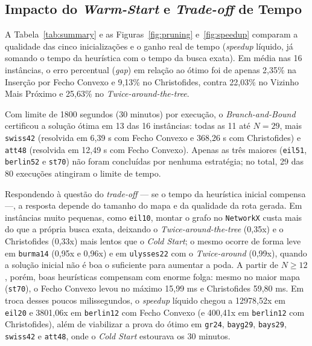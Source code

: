 \documentclass[12pt]{article}
\begin{document}
\subsection{Impacto do \textit{Warm-Start} e \textit{Trade-off} de Tempo}

A Tabela~\ref{tab:summary} e as Figuras~\ref{fig:pruning} e~\ref{fig:speedup} comparam a qualidade das cinco inicializações e o ganho real de tempo (\textit{speedup} líquido, já somando o tempo da heurística com o tempo da busca exata). Em média nas 16 instâncias, o erro percentual (\textit{gap}) em relação ao ótimo foi de apenas 2,35\% na Inserção por Fecho Convexo e 9,13\% no Christofides, contra 22,03\% no Vizinho Mais Próximo e 25,63\% no \textit{Twice-around-the-tree}.

Com limite de 1800 segundos (30 minutos) por execução, o \textit{Branch-and-Bound} certificou a solução ótima em 13 das 16 instâncias: todas as 11 até $N = 29$, mais \texttt{swiss42} (resolvida em 6,39 s com Fecho Convexo e 368,26 s com Christofides) e \texttt{att48} (resolvida em 12,49 s com Fecho Convexo). Apenas as três maiores (\texttt{eil51}, \texttt{berlin52} e \texttt{st70}) não foram concluídas por nenhuma estratégia; no total, 29 das 80 execuções atingiram o limite de tempo.

Respondendo à questão do \textit{trade-off} — se o tempo da heurística inicial compensa —, a resposta depende do tamanho do mapa e da qualidade da rota gerada. Em instâncias muito pequenas, como \texttt{eil10}, montar o grafo no \texttt{NetworkX} custa mais do que a própria busca exata, deixando o \textit{Twice-around-the-tree} (0,35x) e o Christofides (0,33x) mais lentos que o \textit{Cold Start}; o mesmo ocorre de forma leve em \texttt{burma14} (0,95x e 0,96x) e em \texttt{ulysses22} com o \textit{Twice-around} (0,99x), quando a solução inicial não é boa o suficiente para aumentar a poda. A partir de $N \ge 12$, porém, boas heurísticas compensam com enorme folga: mesmo no maior mapa (\texttt{st70}), o Fecho Convexo levou no máximo 15,99 ms e Christofides 59,80 ms. Em troca desses poucos milissegundos, o \textit{speedup} líquido chegou a 12978,52x em \texttt{eil20} e 3801,06x em \texttt{berlin12} com Fecho Convexo (e 400,41x em \texttt{berlin12} com Christofides), além de viabilizar a prova do ótimo em \texttt{gr24}, \texttt{bayg29}, \texttt{bays29}, \texttt{swiss42} e \texttt{att48}, onde o \textit{Cold Start} estourava os 30 minutos.

\begin{table}[htb]
\centering
\caption{Resumo consolidado de gaps de aproximação, nós expandidos e speedup líquido máximo.}
\label{tab:summary}
\scriptsize
\resizebox{\textwidth}{!}{}
\end{table}
\end{document}
